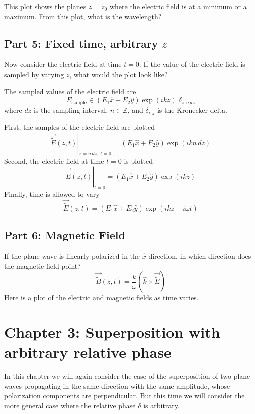 \documentclass{article}
\begin{document}
This plot shows the planes $z=z_0$ where the electric field is at a minimum or a maximum.  From this plot, what is the wavelength?
\subsection{Part 5: Fixed time, arbitrary $z$}
Now consider the electric field at time $t=0$.  If the value of the electric field is sampled by varying $z$, what would the plot look like?

The sampled values of the electric field are
\begin{equation}
    E_{\text{sample}} \in \left(E_1\hat{x} + E_2\hat{y}\right) \exp \left(ikz\right)   \;\delta_{z,n\,dz}
\end{equation}
where $dz$ is the sampling interval, $n \in \mathbb{Z}$, and $\delta_{i,j}$ is the Kronecker delta.

First, the samples of the electric field are plotted
\begin{equation}
    \left.\vec{\widetilde{E}}\left(z,t\right)\right\rvert_{z=n\,dz,\;t=0} = \left(E_1\hat{x} + E_2\hat{y}\right) \exp \left(ikn\,dz\right) 
\end{equation}
Second, the electric field at time $t=0$ is plotted
\begin{equation}
    \left.\vec{\widetilde{E}}\left(z,t\right)\right\rvert_{t=0} = \left(E_1\hat{x} + E_2\hat{y}\right) \exp \left(ikz\right)
\end{equation}
Finally, time is allowed to vary
\begin{equation}
    \vec{\widetilde{E}}\left(z,t\right) = \left(E_1\hat{x} + E_2\hat{y}\right) \exp \left(i kz - i \omega t\right)
\end{equation}
\subsection{Part 6: Magnetic Field}
If the plane wave is linearly polarized in the $\hat x$-direction, in which direction does the magnetic field point?
\begin{equation}
    \vec{\widetilde{B}}\left(z,t\right) =  \frac{k}{\omega} \left(\hat{k}\times\vec{\widetilde{E}}\right)
\end{equation}
Here is a plot of the electric and magnetic fields as time varies.

\section{Chapter 3: Superposition with arbitrary relative phase}
In this chapter we will again consider the case of the superposition of two plane waves propagating in the same direction with the same amplitude, whose polarization components are perpendicular.  But this time we will consider the more general case where the relative phase $\delta$ is arbitrary.  
\end{document}
